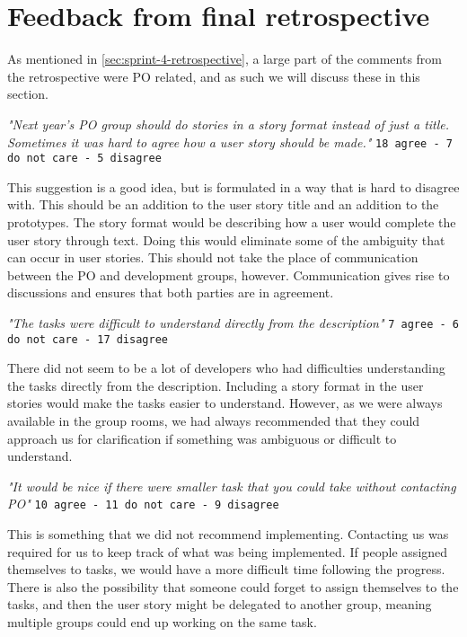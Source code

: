 \section{Feedback from final retrospective}\label{sec:retrospective-discussion}
As mentioned in \autoref{sec:sprint-4-retrospective}, a large part of the comments from the retrospective were PO related, and as such we will discuss these in this section.
\begin{center}
\textit{"Next year's PO group should do stories in a story format instead of just a title. Sometimes it was hard to agree how a user story should be made."}
\newline
\texttt{18 agree - 7 do not care - 5 disagree}
\end{center}
This suggestion is a good idea, but is formulated in a way that is hard to disagree with. 
This should be an addition to the user story title and an addition to the prototypes. 
The story format would be describing how a user would complete the user story through text. 
Doing this would eliminate some of the ambiguity that can occur in user stories.
This should not take the place of communication between the PO and development groups, however.
Communication gives rise to discussions and ensures that both parties are in agreement.
\begin{center}
\textit{"The tasks were difficult to understand directly from the description"}
\newline
\texttt{7 agree - 6 do not care - 17 disagree}
\end{center}
There did not seem to be a lot of developers who had difficulties understanding the tasks directly from the description. 
Including a story format in the user stories would make the tasks easier to understand.
However, as we were always available in the group rooms, we had always recommended that they could approach us for clarification if something was ambiguous or difficult to understand. 
\begin{center}  
\textit{"It would be nice if there were smaller task that you could take without contacting PO"}
\newline
\texttt{10 agree - 11 do not care - 9 disagree}
\end{center}
This is something that we did not recommend implementing. 
Contacting us was required for us to keep track of what was being implemented. 
If people assigned themselves to tasks, we would have a more difficult time following the progress.
There is also the possibility that someone could forget to assign themselves to the tasks, and then the user story might be delegated to another group, meaning multiple groups could end up working on the same task.
